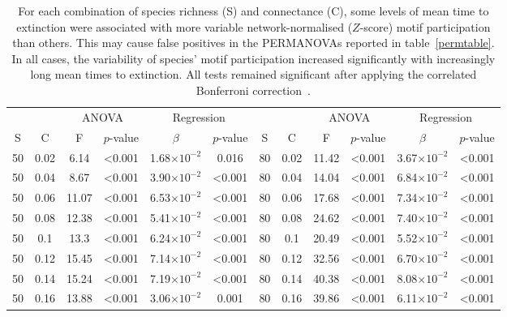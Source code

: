 \documentclass[12pt]{article}
\begin{document}
\begin{spacing}{2.0}
		\begin{table}[h!]
			\caption{For each combination of species richness (S) and connectance (C), some levels of mean time to extinction were associated with more variable network-normalised ($Z$-score) motif participation than others. This may cause false positives in the PERMANOVAs reported in table~\ref{permtable}. In all cases, the variability of species' motif participation increased significantly with increasingly long mean times to extinction. All tests remained significant after applying the correlated Bonferroni correction~\citep{Drezner2016}.}
			\label{betadisp_Z}
			\footnotesize
			\begin{tabular}{c c | c c| c c ||c c | c c | c c |}
            &&\multicolumn{2}{c|}{ANOVA}&\multicolumn{2}{c||}{Regression}&&&\multicolumn{2}{c|}{ANOVA}&\multicolumn{2}{c|}{Regression}\\
            S&C&F&$p$-value&$\beta$&$p$-value&S&C&F&$p$-value&$\beta$&$p$-value\\
            \hline
            50  & 0.02  & 6.14  & \textless0.001  & 1.68$\times10^{-2}$ & 0.016 & 80  & 0.02  & 11.42 & \textless0.001  & 3.67$\times10^{-2}$ & \textless0.001  \\
            50  & 0.04  & 8.67  & \textless0.001  & 3.90$\times10^{-2}$ & \textless0.001  & 80  & 0.04  & 14.04 & \textless0.001  & 6.84$\times10^{-2}$ & \textless0.001  \\
            50  & 0.06  & 11.07 & \textless0.001  & 6.53$\times10^{-2}$ & \textless0.001  & 80  & 0.06  & 17.68 & \textless0.001  & 7.34$\times10^{-2}$ & \textless0.001  \\
            50  & 0.08  & 12.38 & \textless0.001  & 5.41$\times10^{-2}$ & \textless0.001  & 80  & 0.08  & 24.62 & \textless0.001  & 7.40$\times10^{-2}$ & \textless0.001  \\
            50  & 0.1 & 13.3  & \textless0.001  & 6.24$\times10^{-2}$ & \textless0.001  & 80  & 0.1 & 20.49 & \textless0.001  & 5.52$\times10^{-2}$ & \textless0.001  \\
            50  & 0.12  & 15.45 & \textless0.001  & 7.14$\times10^{-2}$ & \textless0.001  & 80  & 0.12  & 32.56 & \textless0.001  & 6.70$\times10^{-2}$ & \textless0.001  \\
            50  & 0.14  & 15.24 & \textless0.001  & 7.19$\times10^{-2}$ & \textless0.001  & 80  & 0.14  & 40.38 & \textless0.001  & 8.08$\times10^{-2}$ & \textless0.001  \\
            50  & 0.16  & 13.88 & \textless0.001  & 3.06$\times10^{-2}$ & 0.001 & 80  & 0.16  & 39.86 & \textless0.001  & 6.11$\times10^{-2}$ & \textless0.001  \\

\end{tabular}
\end{table}
\end{spacing}
\end{document}
